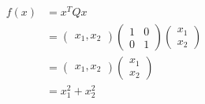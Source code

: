 \begin{align*}
f(x) &= x^{T}Qx \\
&= \begin{pmatrix}x_{1}, x_{2}\end{pmatrix} \begin{pmatrix}1 & 0 \\ 0 & 1\end{pmatrix} \begin{pmatrix}x_{1} \\ x_{2}\end{pmatrix} \\
&= \begin{pmatrix}x_{1}, x_{2}\end{pmatrix} \begin{pmatrix}x_{1} \\ x_{2}\end{pmatrix} \\
&= x_{1}^{2} + x_{2}^{2}
\end{align*}